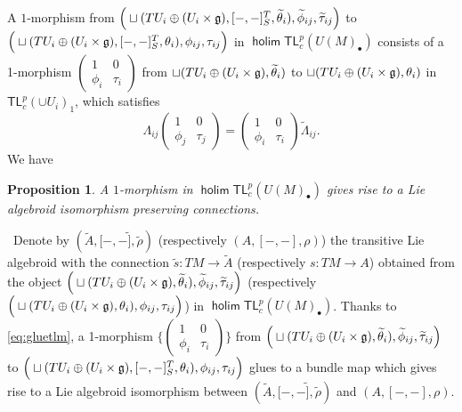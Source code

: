 \documentclass[letterpaper,10pt, oneside]{article} %
\newtheorem{pro}[thm]{Proposition}
\newcommand{\tlp}{{\mathsf{TL}^{p}_{c}}} %
\DeclareMathOperator{\holim}{\mathsf{holim}}
\newcommand{\brtls}[1]{   [    #1   ]_S^T   }
\newcommand{\pf}{\noindent{\bf Proof.}\ }
\begin{document}
A $1$-morphism from  $\Big(\sqcup (TU_i\oplus (U_i\times\g),
  \brtls{-,-},  \widetilde{\theta}_i),\widetilde{\phi}_{ij},\widetilde{\tau}_{ij}\Big) $ to  $\Big(\sqcup (TU_i\oplus (U_i\times\g),
  \brtls{-,-},  \theta_i),\phi_{ij},\tau_{ij}\Big) $ in   $\holim \tlp (U(M)_\bullet)$  consists of
  a 1-morphism $\left(\begin{array}{cc}
1&0\\
\phi_{i}&\tau_{i}
\end{array} \right)$ from $\sqcup (TU_i\oplus (U_i\times\mathfrak g),
   \widetilde{\theta}_i) $ to $\sqcup (TU_i\oplus (U_i\times\mathfrak g),
   \theta_i) $  in $\tlp(\cup U_i)_1$, which satisfies
  \begin{equation}\label{eq:gluetlm}
   \Lambda_{ij}\left(\begin{array}{cc}
1&0\\
\phi_{j}&\tau_{j}
\end{array} \right)=\left(\begin{array}{cc}
1&0\\
\phi_{i}&\tau_{i}
\end{array} \right)\widetilde{\Lambda}_{ij}.
  \end{equation}
 We have

  \begin{pro}\label{pro:tlm}
  A  $1$-morphism  in    $\holim \tlp (U(M)_\bullet)$ gives rise to a Lie algebroid isomorphism
  preserving connections.
  \end{pro}
\pf  Denote by $(\widetilde{A},[-,-\widetilde{]},\widetilde{\rho})$ (respectively  $(A,[-,-],\rho)$) the transitive Lie algebroid with the connection $\widetilde{s}:TM\longrightarrow \widetilde{A}$ (respectively $s: TM \longrightarrow A$) obtained from the object $\Big(\sqcup (TU_i\oplus (U_i\times\mathfrak g),
  \widetilde{\theta}_i),\widetilde{\phi}_{ij},\widetilde{\tau}_{ij}\Big) $ (respectively $\Big(\sqcup (TU_i\oplus (U_i\times\mathfrak g),
     \theta_i),\phi_{ij},\tau_{ij}\Big) $)  in  $\holim \tlp (U(M)_\bullet)$. Thanks to   \eqref{eq:gluetlm},  a 1-morphism $\{\left(\begin{array}{cc}
1&0\\
\phi_{i}&\tau_{i}
\end{array} \right)\}$ from  $\Big(\sqcup (TU_i\oplus (U_i\times\mathfrak g),
  \widetilde{\theta}_i),\widetilde{\phi}_{ij},\widetilde{\tau}_{ij}\Big) $ to $\Big(\sqcup (TU_i\oplus (U_i\times\g),
  \brtls{-,-},  \theta_i),\phi_{ij},\tau_{ij}\Big) $ glues to a bundle map which gives rise to a Lie algebroid isomorphism between $(\widetilde{A},[-,-\widetilde{]},\widetilde{\rho})$ and $(A,[-,-],\rho)$.
\end{document}
